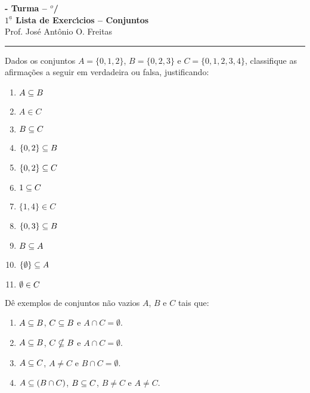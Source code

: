 \documentclass[12pt]{exam}
\begin{document}
\begin{center}
{\Large\bf \disciplina - Turma \turma -- \semestre$^{o}$/\ano} \\ \vspace{9pt} {\large\bf
  $1^{\underline{a}}$ Lista de Exerc{\'\i}cios -- Conjuntos}\\ \vspace{9pt} Prof. Jos{\'e} Ant{\^o}nio O. Freitas
\end{center}
\hrule


\vspace{.6cm}

\questao Dados os conjuntos $A = \{0,1,2\}$, $B = \{0,2,3\}$ e $C = \{0,1,2,3,4\}$, classifique as afirma\c{c}\~oes a seguir em verdadeira ou falsa, justificando:
\begin{multicols}{2}
	\begin{enumerate}[label={\alph*})]
		\item $A \subseteq B$
		\item $A \in C$
		\item $B \subseteq C$
		\item $\{0,2\} \subseteq B$
		\item $\{0,2\} \subseteq C$
		\item $1 \subseteq C$
		\item $\{1,4\} \in C$
		\item $\{0,3\} \subseteq B$
		\item $B \subseteq A$
		\item $\{\emptyset\} \subseteq A$
		\item $\emptyset \in C$
	\end{enumerate}	
\end{multicols}

\questao D\^e exemplos de conjuntos n\~ao vazios $A$, $B$ e $C$ tais que:
\begin{enumerate}[label={\alph*})]
	\item $A \subseteq B$, $C \subseteq B$ e $A \cap C = \emptyset$.
	\item $A \subseteq B$, $C \nsubseteq B$ e $A \cap C = \emptyset$.
	\item $A \subseteq C$, $A \ne C$ e $B \cap C = \emptyset$.
	\item $A \subseteq (B \cap C)$, $B \subseteq C$, $B \ne C$ e $A \ne C$.
\end{enumerate}

\vspace{.3cm}
\end{document}
